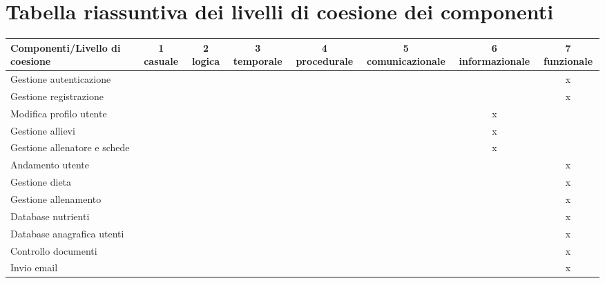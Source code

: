 \documentclass{article}
\begin{document}
      \section{Tabella riassuntiva dei livelli di coesione dei componenti}
      \begin{center}
            \begin{tabular}{|p{3 cm}|c|c|c|c|c|c|c|}
                  \hline
                  Componenti/Livello di coesione & 1 casuale & 2 logica & 3 temporale & 4 procedurale & 5 comunicazionale & 6 informazionale & 7 funzionale\\
                  \hline
                  Gestione autenticazione&&&&&&&x\\
                  \hline
                  Gestione registrazione&&&&&&&x\\
                  \hline
                  Modifica profilo utente&&&&&&x&\\
                  \hline
                  Gestione allievi&&&&&&x&\\
                  \hline
                  Gestione allenatore e schede&&&&&&x&\\
                  \hline
                  Andamento utente&&&&&&&x\\
                  \hline
                  Gestione dieta&&&&&&&x\\
                  \hline
                  Gestione allenamento&&&&&&&x\\
                  \hline
                  Database nutrienti&&&&&&&x\\
                  \hline
                  Database anagrafica utenti&&&&&&&x\\
                  \hline
                  Controllo documenti&&&&&&&x\\
                  \hline
                  Invio email&&&&&&&x\\
                  \hline
            \end{tabular}
      \end{center}
\end{document}
